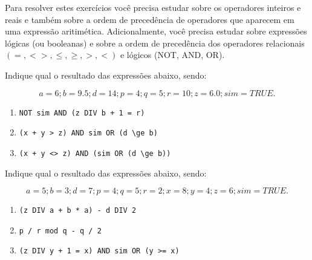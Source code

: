   Para resolver estes exercícios
  você precisa estudar sobre os operadores
  inteiros e reais e também sobre a ordem de precedência de operadores
  que aparecem em uma expressão aritimética. Adicionalmente, você precisa
  estudar sobre expressões lógicas (ou booleanas) e sobre a ordem de
  precedência dos operadores relacionais $(=, <>, \le, \ge, >, <)$ e
  lógicos (NOT, AND, OR).

\item Indique qual o resultado das expressões abaixo, sendo: 

\[
  a=6; b=9.5; d=14; p=4; q=5; r=10; z=6.0 ; sim= TRUE.
\]

\begin {enumerate}
\item \verb|NOT sim AND (z DIV b + 1 = r)|
\item \verb|(x + y > z) AND sim OR (d \ge b)|
\item \verb|(x + y <> z) AND (sim OR (d \ge b))|
\end {enumerate}

\item Indique qual o resultado das expressões abaixo, sendo: 

\[
  a=5; b=3; d=7;  p=4; q=5; r=2; x=8; y=4; z=6; sim=TRUE.
\]

\begin{enumerate}
\item \verb|(z DIV a + b * a) - d DIV 2|
\item \verb|p / r mod q - q / 2|
\item \verb|(z DIV y + 1 = x) AND sim OR (y >= x)|
\end{enumerate}

